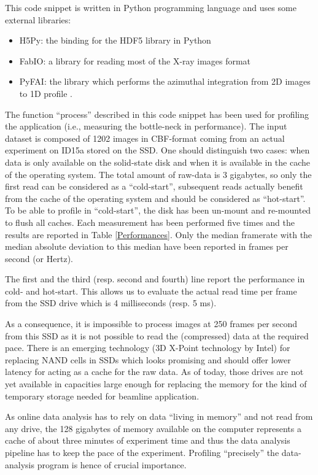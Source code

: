 \documentclass[preprint]{iucr}              %
\begin{document}
This code snippet is written in Python \cite{python} programming language and
uses some external libraries:
\begin{itemize}
  \item {H5Py}: the binding for the HDF5 library in Python \cite{h5py}
  \item{FabIO}: a library for reading most of the X-ray images format
  \cite{fabio}
  \item{PyFAI}: the library which performs the azimuthal
  integration from 2D images to 1D profile \cite{pyFAI}. 
\end{itemize}

The function ``process'' described in this code snippet has been used for
profiling the application (i.e., measuring the bottle-neck in performance).
The input dataset is composed of 1202 images in CBF-format coming from an actual
experiment on ID15a stored on the SSD.
One should distinguish two cases: when data is only available on the
solid-state disk and when it is available in the cache of the
operating system.
The total amount of raw-data is 3 gigabytes, so only the first read can be
considered as a ``cold-start'', subsequent reads actually benefit from
the cache of the operating system and should be considered as ``hot-start''.
To be able to profile in ``cold-start'', the disk has been un-mount and re-mounted
to flush all caches.
Each measurement has been performed five times and the results are reported in
Table \ref{Performances}.  Only the median framerate  with the median absolute
deviation to this median have been reported in frames per second (or Hertz).

The first and the third (resp. second and fourth) line report the performance
in cold- and hot-start.
This allows us to evaluate the actual read time per frame from the SSD
drive which is 4 milliseconds (resp. 5 ms).

As a consequence, it is impossible to process images at 250 frames per
second from this SSD as it is not possible to read the (compressed) data
at the required pace.
There is an emerging technology (3D X-Point technology by Intel) for replacing
NAND cells in SSDs which looks promising and should offer
lower latency for acting as a cache for the raw data. 
As of today, those drives are not yet available in capacities large
enough for replacing the memory for the kind of temporary storage needed for
beamline application.

As online data analysis has to rely on data ``living in memory'' and not
read from any drive, the 128 gigabytes of memory available on the computer
represents a cache of about three minutes of experiment time and thus the data
analysis pipeline has to keep the pace of the experiment. 
Profiling ``precisely'' the data-analysis program is hence of crucial
importance.
\end{document}
